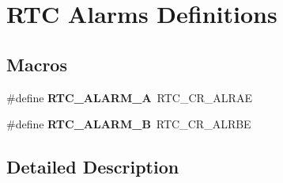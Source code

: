\hypertarget{group___r_t_c___alarms___definitions}{}\section{R\+TC Alarms Definitions}
\label{group___r_t_c___alarms___definitions}
\subsection*{Macros}
\begin{DoxyCompactItemize}
\item 
\#define {\bfseries R\+T\+C\+\_\+\+A\+L\+A\+R\+M\+\_\+A}~R\+T\+C\+\_\+\+C\+R\+\_\+\+A\+L\+R\+AE\hypertarget{group___r_t_c___alarms___definitions_ga916bcb75517157e284344f96ac275639}{}\label{group___r_t_c___alarms___definitions_ga916bcb75517157e284344f96ac275639}

\item 
\#define {\bfseries R\+T\+C\+\_\+\+A\+L\+A\+R\+M\+\_\+B}~R\+T\+C\+\_\+\+C\+R\+\_\+\+A\+L\+R\+BE\hypertarget{group___r_t_c___alarms___definitions_ga55b831e961f8f4b91ec17939eb78b440}{}\label{group___r_t_c___alarms___definitions_ga55b831e961f8f4b91ec17939eb78b440}

\end{DoxyCompactItemize}


\subsection{Detailed Description}
